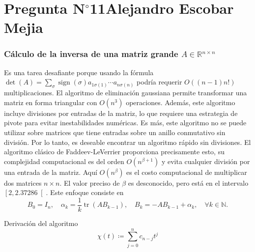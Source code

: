 \section{Pregunta N$^{\circ}$11\qquad Alejandro Escobar Mejia}

\begin{frame}
	\frametitle{
		Cálculo de la inversa de una matriz grande
		$A\in\mathbb{R}^{n\times n}$
	}

	Es una tarea desafiante porque usando la fórmula
	\begin{math}
		\det\left(A\right)=
		\sum_{\sigma}
		\operatorname{sign}\left(\sigma\right)
		a_{1\sigma\left(1\right)}
		\cdots
		a_{n\sigma\left(n\right)}
	\end{math}
	podría requerir $O\left(\left(n-1\right)n!\right)$
	multiplicaciones.
	El algoritmo de eliminación gaussiana permite transformar una
	matriz en forma triangular con $O\left(n^{3}\right)$ operaciones.
	Además, este algoritmo incluye divisiones por entradas de la
	matriz, lo que requiere una estrategia de pivote para evitar
	inestabilidades numéricas.
	Es más, este algoritmo no se puede utilizar sobre matrices que
	tiene entradas sobre un anillo conmutativo sin división.
	Por lo tanto, es deseable encontrar un algoritmo rápido sin
	divisiones.
	El algoritmo clásico de \alert{Faddeev-LeVerrier} proporciona
	precisamente esto, su complejidad computacional es del orden
	$O\left(n^{\beta+1}\right)$ y evita cualquier división por una
	entrada de la matriz.
	Aquí $O\left(n^{\beta}\right)$ es el costo computacional de
	multiplicar dos matrices $n\times n$.
	El valor preciso de $\beta$ es desconocido, pero está en el
	intervalo $\left[2,2.37286\right[$. Este enfoque consiste en
	\begin{equation*}
		B_{0}=I_{n},\quad
		\alpha_{k}=
		\dfrac{1}{k}
		\operatorname{tr}\left(AB_{k-1}\right),\quad
		B_{k}=-AB_{k-1}+\alpha_{k},\quad
		\forall k\in\mathbb{N}.
	\end{equation*}

	\begin{block}{Derivación del algoritmo}
		\begin{equation*}
			\chi\left(t\right)\coloneqq
			\sum\limits_{j=0}^{n}
			c_{n-j}t^{j}
		\end{equation*}
	\end{block}
\end{frame}

